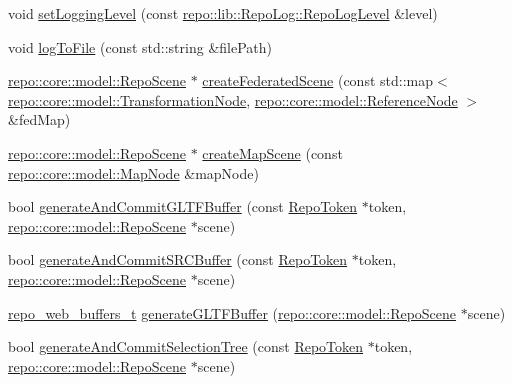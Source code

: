 \begin{DoxyCompactItemize}
\item 
void \hyperlink{classrepo_1_1_repo_controller_a12776d906c8be7417e047d2bfb7b8e76}{set\+Logging\+Level} (const \hyperlink{classrepo_1_1lib_1_1_repo_log_ad1d3f8148a47d718e4bf86a9d1edff81}{repo\+::lib\+::\+Repo\+Log\+::\+Repo\+Log\+Level} \&level)
\item 
void \hyperlink{classrepo_1_1_repo_controller_a14c295730d3587ac7d302c76f920ba10}{log\+To\+File} (const std\+::string \&file\+Path)
\item 
\hyperlink{classrepo_1_1core_1_1model_1_1_repo_scene}{repo\+::core\+::model\+::\+Repo\+Scene} $\ast$ \hyperlink{classrepo_1_1_repo_controller_aaa58de85f705a84c86ad52b030eea659}{create\+Federated\+Scene} (const std\+::map$<$ \hyperlink{classrepo_1_1core_1_1model_1_1_transformation_node}{repo\+::core\+::model\+::\+Transformation\+Node}, \hyperlink{classrepo_1_1core_1_1model_1_1_reference_node}{repo\+::core\+::model\+::\+Reference\+Node} $>$ \&fed\+Map)
\item 
\hyperlink{classrepo_1_1core_1_1model_1_1_repo_scene}{repo\+::core\+::model\+::\+Repo\+Scene} $\ast$ \hyperlink{classrepo_1_1_repo_controller_a49a968af6e72acfebcbde76b57d30ca3}{create\+Map\+Scene} (const \hyperlink{classrepo_1_1core_1_1model_1_1_map_node}{repo\+::core\+::model\+::\+Map\+Node} \&map\+Node)
\item 
bool \hyperlink{classrepo_1_1_repo_controller_afcc523ea374280317847b48c272e24b6}{generate\+And\+Commit\+G\+L\+T\+F\+Buffer} (const \hyperlink{class_repo_controller_1_1_repo_token}{Repo\+Token} $\ast$token, \hyperlink{classrepo_1_1core_1_1model_1_1_repo_scene}{repo\+::core\+::model\+::\+Repo\+Scene} $\ast$scene)
\item 
bool \hyperlink{classrepo_1_1_repo_controller_ab7afeaadb21dc079045b4c0b8a65ba56}{generate\+And\+Commit\+S\+R\+C\+Buffer} (const \hyperlink{class_repo_controller_1_1_repo_token}{Repo\+Token} $\ast$token, \hyperlink{classrepo_1_1core_1_1model_1_1_repo_scene}{repo\+::core\+::model\+::\+Repo\+Scene} $\ast$scene)
\item 
\hyperlink{structrepo__web__buffers__t}{repo\+\_\+web\+\_\+buffers\+\_\+t} \hyperlink{classrepo_1_1_repo_controller_acaab616075615c8b2f535627feaadb7b}{generate\+G\+L\+T\+F\+Buffer} (\hyperlink{classrepo_1_1core_1_1model_1_1_repo_scene}{repo\+::core\+::model\+::\+Repo\+Scene} $\ast$scene)
\item 
bool \hyperlink{classrepo_1_1_repo_controller_ab92c198a88c96bdf8138b49ebe277f5a}{generate\+And\+Commit\+Selection\+Tree} (const \hyperlink{class_repo_controller_1_1_repo_token}{Repo\+Token} $\ast$token, \hyperlink{classrepo_1_1core_1_1model_1_1_repo_scene}{repo\+::core\+::model\+::\+Repo\+Scene} $\ast$scene)

\end{DoxyCompactItemize}
